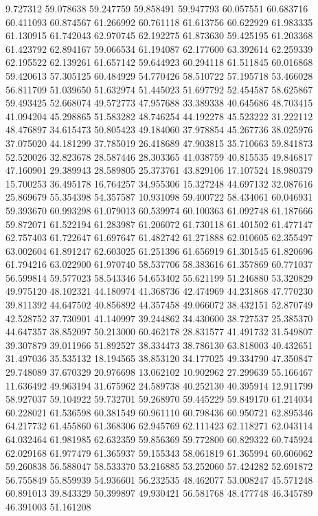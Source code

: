 9.727312
59.078638
59.247759
59.858491
59.947793
60.057551
60.683716
60.411093
60.874567
61.266992
60.761118
61.613756
60.622929
61.983335
61.130915
61.742043
62.970745
62.192275
61.873630
59.425195
61.203368
61.423792
62.894167
59.066534
61.194087
62.177600
63.392614
62.259339
62.195522
62.139261
61.657142
59.644923
60.294118
61.511845
60.016868
59.420613
57.305125
60.484929
54.770426
58.510722
57.195718
53.466028
56.811709
51.039650
51.632974
51.445023
51.697792
52.454587
58.625867
59.493425
52.668074
49.572773
47.957688
33.389338
40.645686
48.703415
41.094204
45.298865
51.583282
48.746254
44.192278
45.523222
31.222112
48.476897
34.615473
50.805423
49.184060
37.978854
45.267736
38.025976
37.075020
44.181299
37.785019
26.418689
47.903815
35.710663
59.841873
52.520026
32.823678
28.587446
28.303365
41.038759
40.815535
49.846817
47.160901
29.389943
28.589805
25.373761
43.829106
17.107524
18.980379
15.700253
36.495178
16.764257
34.955306
15.327248
44.697132
32.087616
25.869679
55.354398
54.357587
10.931098
59.400722
58.434061
60.046931
59.393670
60.993298
61.079013
60.539974
60.100363
61.092748
61.187666
59.872071
61.522194
61.283987
61.206072
61.730118
61.401502
61.477147
62.757403
61.722647
61.697647
61.482742
61.271888
62.010605
62.355497
63.002604
61.891247
62.603025
61.251396
61.656919
61.301545
61.820696
61.794216
63.022900
61.970740
58.537706
58.383616
61.357869
60.771037
56.599814
59.577023
58.543346
54.653402
55.621199
51.246880
53.320829
49.975120
48.102321
44.180974
41.368736
42.474969
44.231868
47.770230
39.811392
44.647502
40.856892
44.357458
49.066072
38.432151
52.870749
42.528752
37.730901
41.140997
39.244862
34.430600
38.727537
25.385370
44.647357
38.852097
50.213000
60.462178
28.831577
41.491732
31.549807
39.307879
39.011966
51.892527
38.334473
38.786130
63.818003
40.432651
31.497036
35.535132
18.194565
38.853120
34.177025
49.334790
47.350847
29.748089
37.670329
20.976698
13.062102
10.902962
27.299639
55.166467
11.636492
49.963194
31.675962
24.589738
40.252130
40.395914
12.911799
58.927037
59.104922
59.732701
59.268970
59.445229
59.849170
61.214034
60.228021
61.536598
60.381549
60.961110
60.798436
60.950721
62.895346
64.217732
61.455860
61.368306
62.945769
62.111423
62.118271
62.043114
64.032464
61.981985
62.632359
59.856369
59.772800
60.829322
60.745924
62.029168
61.977479
61.365937
59.155343
58.061819
61.365994
60.606062
59.260838
56.588047
58.533370
53.216885
53.252060
57.424282
52.691872
56.755849
55.859939
54.936601
56.232535
48.462077
53.008247
45.571248
60.891013
39.843329
50.399897
49.930421
56.581768
48.477748
46.345789
46.391003
51.161208
